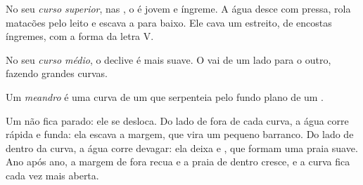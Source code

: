 No seu \emph{curso superior}, nas , o  é jovem e íngreme. A
água desce com pressa, rola matacões pelo leito e escava a  para
baixo. Ele cava um  estreito, de encostas íngremes, com a forma da
letra V.

No seu \emph{curso médio}, o declive é mais suave. O  vai de um lado
para o outro, fazendo grandes curvas.

\begin{definition}[Meandro]\label{def:g5:water-shapes-the-land:meander}
Um \emph{meandro} é uma curva de um  que serpenteia pelo
fundo plano de um .
\end{definition}

Um  não fica parado: ele se desloca. Do lado de fora de cada curva,
a água corre rápida e funda: ela escava a margem, que vira um pequeno
barranco. Do lado de dentro da curva, a água corre devagar: ela deixa 
e , que formam uma praia suave. Ano após ano, a margem de fora
recua e a praia de dentro cresce, e a curva fica cada vez mais aberta.

